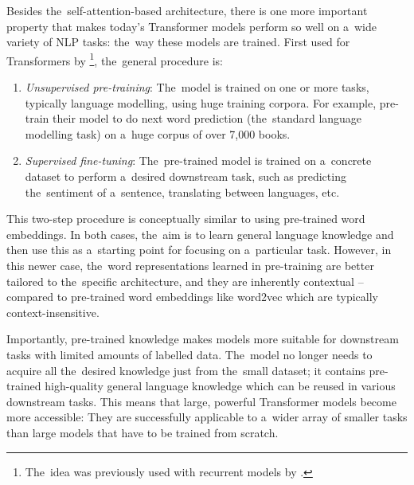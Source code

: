 \documentclass[bsc,frontabs,singlespacing,parskip,deptreport]{infthesis}
\begin{document}
{{{      %
      Besides the~self-attention-based architecture, there is one more important property that makes today's Transformer models perform so well on a~wide variety of NLP tasks: the~way these models are trained. First used for Transformers by \citet{Radford_2018}\footnote{The~idea was previously used with recurrent models by \citet{Dai_2015}.}, the~general procedure is:
      \begin{enumerate}
        \item \textit{Unsupervised pre-training}: The~model is trained on one or more tasks, typically language modelling, using huge training corpora. For example, \citeauthor{Radford_2018} pre-train their model to do next word prediction (the~standard language modelling task) on a~huge corpus of over 7,000 books.
        \item \textit{Supervised fine-tuning}: The~pre-trained model is trained on a~concrete dataset to perform a~desired downstream task, such as predicting the~sentiment of a~sentence, translating between languages, etc.
      \end{enumerate}
      This two-step procedure is conceptually similar to using pre-trained word embeddings. In both cases, the~aim is to learn general language knowledge and then use this as a~starting point for focusing on a~particular task. However, in this newer case, the~word representations learned in pre-training are better tailored to the~specific architecture, and they are inherently contextual -- compared to pre-trained word embeddings like word2vec which are typically context-insensitive. 

      Importantly, pre-trained knowledge makes models more suitable for downstream tasks with limited amounts of labelled data. The~model no longer needs to acquire all the~desired knowledge just from the~small dataset; it contains pre-trained high-quality general language knowledge which can be reused in various downstream tasks. This means that large, powerful Transformer models become more accessible: They are successfully applicable to a~wider array of smaller tasks than large models that have to be trained from scratch.
    }

}}
\end{document}
